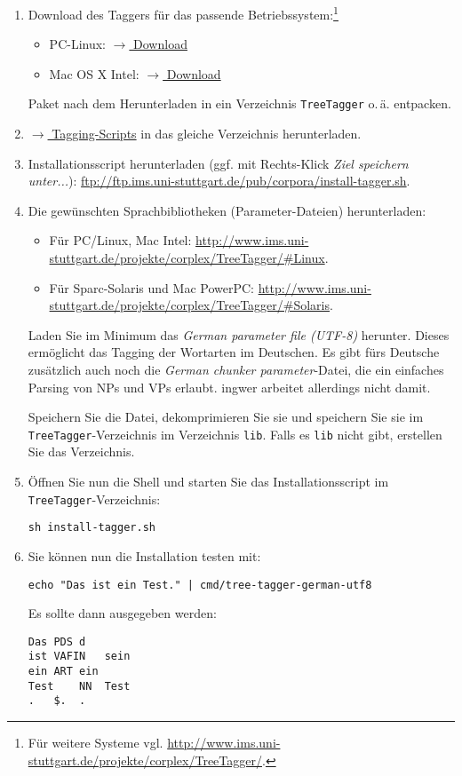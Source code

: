 \documentclass[11pt]{scrartcl} %
\begin{document}
\begin{enumerate}
\item Download des Taggers für das passende Betriebssystem:\footnote{Für weitere Systeme vgl. \url{http://www.ims.uni-stuttgart.de/projekte/corplex/TreeTagger/}.}
\begin{itemize}
\item PC-Linux: \href{ftp://ftp.ims.uni-stuttgart.de/pub/corpora/tree-tagger-linux-3.2.tar.gz}{$\rightarrow$ Download}
\item Mac OS X Intel: \href{ftp://ftp.ims.uni-stuttgart.de/pub/corpora/tree-tagger-MacOSX-3.2-intel.tar.gz}{$\rightarrow$ Download}
\end{itemize}
Paket nach dem Herunterladen in ein Verzeichnis \texttt{TreeTagger} o.\,ä. entpacken.
\item \href{ftp://ftp.ims.uni-stuttgart.de/pub/corpora/tagger-scripts.tar.gz}{$\rightarrow$ Tagging-Scripts} in das gleiche Verzeichnis herunterladen.
\item Installationsscript herunterladen (ggf. mit Rechts-Klick \emph{Ziel speichern unter...}): \url{ftp://ftp.ims.uni-stuttgart.de/pub/corpora/install-tagger.sh}.
\item Die gewünschten Sprachbibliotheken (Parameter-Dateien) herunterladen:
\begin{itemize}
\item Für PC/Linux, Mac Intel: \url{http://www.ims.uni-stuttgart.de/projekte/corplex/TreeTagger/#Linux}.
\item Für Sparc-Solaris und Mac PowerPC: \url{http://www.ims.uni-stuttgart.de/projekte/corplex/TreeTagger/#Solaris}.
\end{itemize}
Laden Sie im Minimum das \emph{German parameter file (UTF-8)} herunter. Dieses ermöglicht das Tagging der Wortarten im Deutschen. Es gibt fürs Deutsche zusätzlich auch noch die \emph{German chunker parameter}-Datei, die ein einfaches Parsing von NPs und VPs erlaubt. ingwer arbeitet allerdings nicht damit.

Speichern Sie die Datei, dekomprimieren Sie sie und speichern Sie sie im \texttt{TreeTagger}-Verzeichnis im Verzeichnis \texttt{lib}. Falls es \texttt{lib} nicht gibt, erstellen Sie das Verzeichnis.
\item Öffnen Sie nun die Shell und starten Sie das Installationsscript im \texttt{TreeTagger}-Verzeichnis:
\begin{verbatim}
sh install-tagger.sh
\end{verbatim}
\item Sie können nun die Installation testen mit:
\begin{verbatim}
echo "Das ist ein Test." | cmd/tree-tagger-german-utf8
\end{verbatim}
Es sollte dann ausgegeben werden:
\begin{verbatim}
Das	PDS	d
ist	VAFIN	sein
ein	ART	ein
Test	NN	Test
.	$.	.
\end{verbatim}
\end{enumerate}
\end{document}

